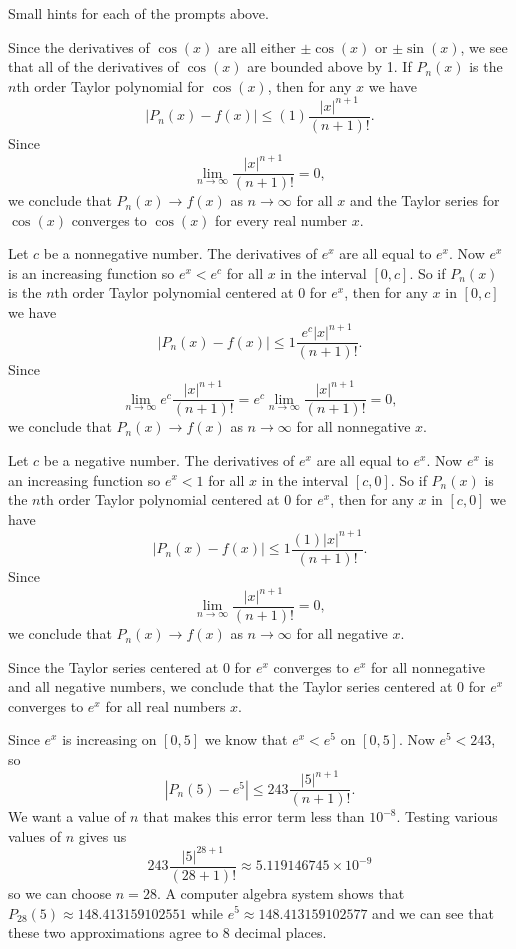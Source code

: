 \begin{smallhint}
\ba
	\item Small hints for each of the prompts above.
\ea
\end{smallhint}
\begin{bighint}
\ba
	\item Since the derivatives of $\cos(x)$ are all either $\pm \cos(x)$ or $\pm \sin(x)$, we see that all of the derivatives of $\cos(x)$ are bounded above by 1. If $P_n(x)$ is the $n$th order Taylor polynomial for $\cos(x)$, then for any $x$ we have 
\[\left|P_n(x) - f(x)\right| \leq (1)\frac{|x|^{n+1}}{(n+1)!}.\]
Since 
\[\lim_{n \to \infty} \frac{|x|^{n+1}}{(n+1)!} = 0,\]
we conclude that $P_n(x) \to f(x)$ as $n \to \infty$ for all $x$ and the Taylor series for $\cos(x)$ converges to $\cos(x)$ for every real number $x$.
\item
    \bal
    \item Let $c$ be a nonnegative number. The derivatives of $e^x$ are all equal to $e^x$. Now $e^x$ is an increasing function so $e^x < e^c$ for all $x$ in the interval $[0,c]$. So if $P_n(x)$ is the $n$th order Taylor polynomial centered at 0 for $e^x$, then for any $x$ in $[0,c]$ we have
\[\left|P_n(x) - f(x)\right| \leq 1\frac{e^c|x|^{n+1}}{(n+1)!}.\]
Since
\[\lim_{n \to \infty} e^c\frac{|x|^{n+1}}{(n+1)!} = e^c\lim_{n \to \infty} \frac{|x|^{n+1}}{(n+1)!} = 0,\]
we conclude that $P_n(x) \to f(x)$ as $n \to \infty$ for all nonnegative $x$. 
    \item Let $c$ be a negative number. The derivatives of $e^x$ are all equal to $e^x$. Now $e^x$ is an increasing function so $e^x < 1$ for all $x$ in the interval $[c,0]$. So if $P_n(x)$ is the $n$th order Taylor polynomial centered at 0 for $e^x$, then for any $x$ in $[c,0]$ we have
\[\left|P_n(x) - f(x)\right| \leq 1\frac{(1)|x|^{n+1}}{(n+1)!}.\]
Since
\[\lim_{n \to \infty} \frac{|x|^{n+1}}{(n+1)!} = 0,\]
we conclude that $P_n(x) \to f(x)$ as $n \to \infty$ for all negative $x$. 
    \item Since the Taylor series centered at 0 for $e^x$ converges to $e^x$ for all nonnegative and all negative numbers, we conclude that the Taylor series centered at 0 for $e^x$ converges to $e^x$ for all real numbers $x$.
    \eal

\item Since $e^x$ is increasing on $[0,5]$ we know that $e^x < e^5$ on $[0,5]$. Now $e^5 < 243$, so 
\[\left|P_n(5) - e^5\right| \leq 243\frac{|5|^{n+1}}{(n+1)!}.\]
We want a value of $n$ that makes this error term less than $10^{-8}$. Testing various values of $n$ gives us 
\[243\frac{|5|^{28+1}}{(28+1)!} \approx 5.119146745 \times 10^{-9}\]
so we can choose $n=28$. A computer algebra system shows that $P_{28}(5) \approx 148.413159102551$ while $e^5 \approx 148.413159102577$ and we can see that these two approximations agree to 8 decimal places.
\ea
\end{bighint}
\begin{activitySolution}


\end{activitySolution}
\aftera 
